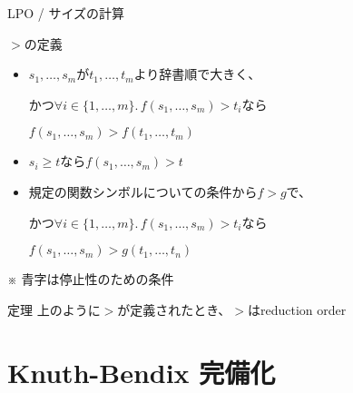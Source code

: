 \documentclass[dvipdfmx,11pt,notheorems]{beamer}
\theoremstyle{definition}
\newcommand{\blue}[1]{{\color{blue} #1}}
\begin{document}
\begin{frame}{LPO / サイズの計算}
  \begin{block}{$>$の定義}
    \begin{itemize}
      \item $s_1, \ldots, s_m$が$t_1, \ldots, t_m$より辞書順で大きく、

      かつ$\forall i \in \{1, \ldots, m\}.\, f(s_1, \ldots, s_m) > t_i$なら

      $f(s_1, \ldots, s_m) > f(t_1, \ldots, t_m)$

      \item $s_i \geq t$なら$f(s_1, \ldots, s_m) > t$

      \item 規定の関数シンボルについての条件から$f>g$で、

      かつ$\forall i \in \{1, \ldots, m\}.\, f(s_1, \ldots, s_m) > t_i$なら

      $f(s_1, \ldots, s_m) > g(t_1, \ldots, t_n)$
    \end{itemize}

    ※\blue{青字}は停止性のための条件
  \end{block}
  \begin{block}{定理}
    上のように$>$が定義されたとき、$>$はreduction order
  \end{block}
\end{frame}

\section{Knuth-Bendix 完備化}
\end{document}
